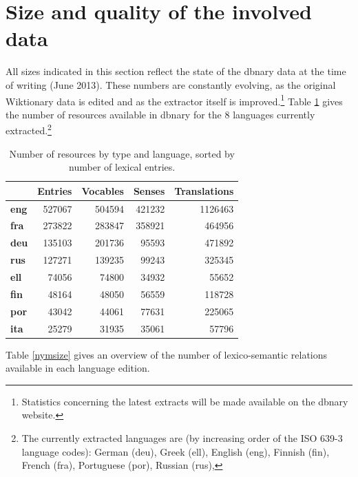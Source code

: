 \documentclass[sw]{iosart2c}
\begin{document}
\section{Size and quality of the involved data}

All sizes indicated in this section reflect the state of the dbnary data at the time of writing (June 2013). These numbers are constantly evolving, as the original Wiktionary data is edited and as the extractor itself is improved.\footnote{Statistics concerning the latest extracts will be made available on the dbnary website.}
 Table \ref{globalsize} gives the number of resources available in dbnary for the 8 languages currently extracted.\footnote{The currently extracted languages are (by increasing order of the ISO 639-3 language codes):
German (deu),
Greek (ell),
English (eng),
Finnish (fin),
French (fra),
Portuguese (por),
Russian (rus),
}

\begin{table}[htb]
\begin{tabular}{lrrrr}
 & \textbf{Entries} & \textbf{Vocables} & \textbf{Senses} & \textbf{Translations}\\
 \hline
\textbf{eng} & 527067 & 504594 & 421232 & 1126463 \\
\textbf{fra} & 273822 & 283847 & 358921 & 464956 \\
\textbf{deu} & 135103 & 201736 & 95593 & 471892 \\
\textbf{rus} & 127271 & 139235 & 99243 & 325345 \\
\textbf{ell} & 74056 & 74800 & 34932 & 55652 \\
\textbf{fin} & 48164 & 48050 & 56559 & 118728 \\
\textbf{por} & 43042 & 44061 & 77631 & 225065 \\
\textbf{ita} & 25279 & 31935 & 35061 & 57796 \\
\end{tabular}
\caption{Number of resources by type and language, sorted by number of lexical entries.}\label{globalsize}
\end{table}



Table \ref{nymsize} gives an overview of the number of lexico-semantic relations available in each language edition.
\end{document}
